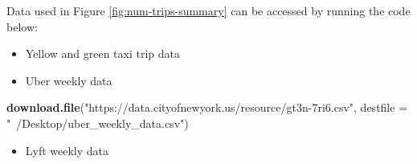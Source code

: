\documentclass[12pt,twoside]{reedthesis}
\newenvironment{Shaded}{\begin{snugshade}}{\end{snugshade}}
\newcommand{\KeywordTok}[1]{\textcolor[rgb]{0.13,0.29,0.53}{\textbf{#1}}}
\newcommand{\DataTypeTok}[1]{\textcolor[rgb]{0.13,0.29,0.53}{#1}}
\newcommand{\DecValTok}[1]{\textcolor[rgb]{0.00,0.00,0.81}{#1}}
\newcommand{\StringTok}[1]{\textcolor[rgb]{0.31,0.60,0.02}{#1}}
\newcommand{\OperatorTok}[1]{\textcolor[rgb]{0.81,0.36,0.00}{\textbf{#1}}}
\newcommand{\NormalTok}[1]{#1}
\providecommand{\tightlist}{%
  \setlength{\itemsep}{0pt}\setlength{\parskip}{0pt}}
\theoremstyle{definition}
\theoremstyle{definition}
\theoremstyle{definition}
\theoremstyle{remark}
\begin{document}
Data used in Figure \ref{fig:num-trips-summary} can be accessed by
running the code below:
\begin{itemize}
\tightlist
\item
  Yellow and green taxi trip data
\end{itemize}
\begin{Shaded}
\end{Shaded}
\begin{itemize}
\tightlist
\item
  Uber weekly data
\end{itemize}
\begin{Shaded}
\begin{Highlighting}[]
\KeywordTok{download.file}\NormalTok{(}\StringTok{"https://data.cityofnewyork.us/resource/gt3n-7ri6.csv"}\NormalTok{,}
              \DataTypeTok{destfile =} \StringTok{"~/Desktop/uber_weekly_data.csv"}\NormalTok{)}
\end{Highlighting}
\end{Shaded}
\begin{itemize}
\tightlist
\item
  Lyft weekly data
\end{itemize}
\end{document}
